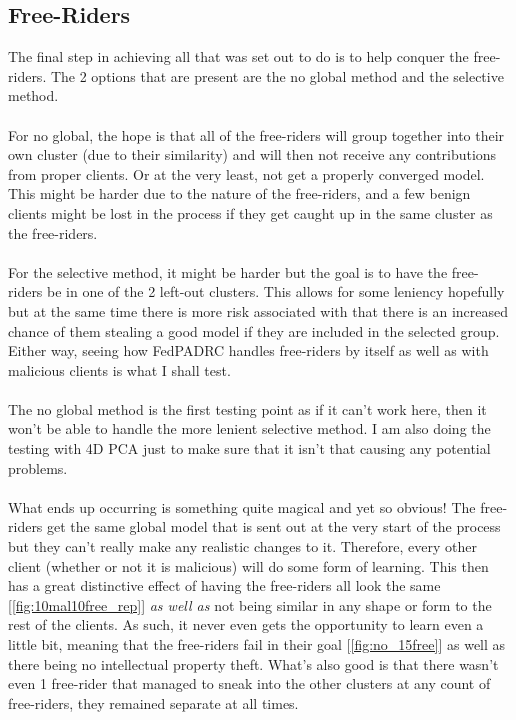 \subsection{Free-Riders}
The final step in achieving all that was set out to do is to help conquer the free-riders.
The 2 options that are present are the no global method and the selective method.
\\ \\
For no global, the hope is that all of the free-riders will group together into their own cluster (due to their similarity) and will then not receive any contributions from proper clients.
Or at the very least, not get a properly converged model.
This might be harder due to the nature of the free-riders, and a few benign clients might be lost in the process if they get caught up in the same cluster as the free-riders.
\\ \\
For the selective method, it might be harder but the goal is to have the free-riders be in one of the 2 left-out clusters.
This allows for some leniency hopefully but at the same time there is more risk associated with that there is an increased chance of them stealing a good model if they are included in the selected group.
Either way, seeing how FedPADRC handles free-riders by itself as well as with malicious clients is what I shall test.
\\ \\
The no global method is the first testing point as if it can't work here, then it won't be able to handle the more lenient selective method.
I am also doing the testing with 4D PCA just to make sure that it isn't that causing any potential problems.
\\ \\
What ends up occurring is something quite magical and yet so obvious!
The free-riders get the same global model that is sent out at the very start of the process but they can't really make any realistic changes to it.
Therefore, every other client (whether or not it is malicious) will do some form of learning.
This then has a great distinctive effect of having the free-riders all look the same [\ref{fig:10mal10free_rep}] \textit{as well as} not being similar in any shape or form to the rest of the clients.
As such, it never even gets the opportunity to learn even a little bit, meaning that the free-riders fail in their goal [\ref{fig:no_15free}] as well as there being no intellectual property theft.
What's also good is that there wasn't even 1 free-rider that managed to sneak into the other clusters at any count of free-riders, they remained separate at all times.
